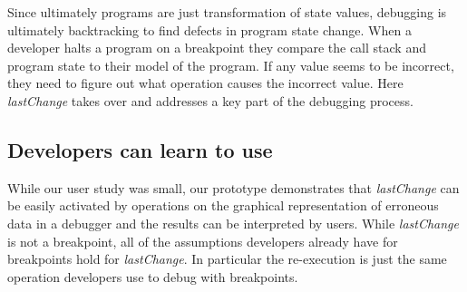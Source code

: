 \documentclass{sig-alternate}
\begin{document}
Since ultimately programs are just
transformation of state values, debugging is ultimately backtracking
to find defects in program state change\cite{Weiser,Zeller}.  When a developer halts a
program on a breakpoint they compare the call stack and program state to their model of the program.
If any value seems to be incorrect,  they need to figure out what operation
causes the incorrect value. Here \textit{lastChange} takes over and addresses a key
part of the debugging process.

\subsection{Developers can learn to use }

While our user study was small, our prototype demonstrates that
\textit{lastChange} can be easily activated by operations on the
graphical representation of erroneous data in a debugger and the 
results can be interpreted by users. 
While \textit{lastChange} is not a breakpoint, 
all of the assumptions developers already have for breakpoints hold
for \textit{lastChange}. In particular the re-execution is just the
same operation developers use to debug with breakpoints. 

\end{document}
